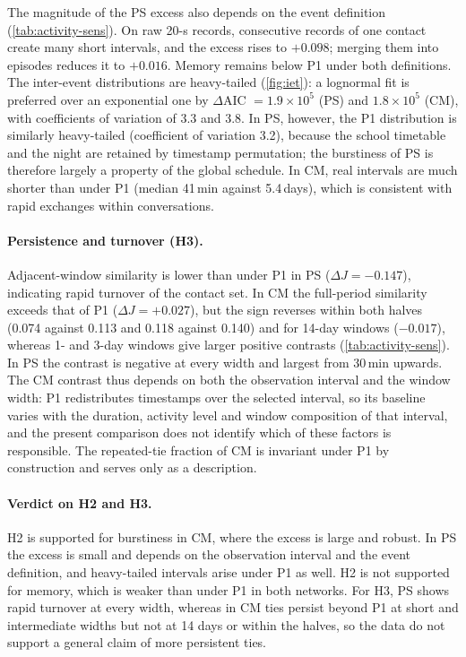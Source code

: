 The magnitude of the PS excess also depends on the event definition
(\cref{tab:activity-sens}). On raw 20-s records, consecutive records of one contact create
many short intervals, and the excess rises to $+0.098$; merging them into episodes reduces it
to $+0.016$. Memory remains below P1 under both definitions. The inter-event distributions
are heavy-tailed (\cref{fig:iet}): a lognormal fit is preferred over an exponential one by
$\Delta$AIC $=1.9\times10^5$ (PS) and $1.8\times10^5$ (CM), with coefficients of variation
of 3.3 and 3.8. In PS, however, the P1 distribution is similarly heavy-tailed (coefficient
of variation 3.2), because the school timetable and the night are retained by timestamp
permutation; the burstiness of PS is therefore largely a property of the global schedule.
In CM, real intervals are much shorter than under P1 (median 41\,min against 5.4\,days),
which is consistent with rapid exchanges within conversations.

\paragraph{Persistence and turnover (H3).}
Adjacent-window similarity is lower than under P1 in PS ($\Delta J=-0.147$), indicating
rapid turnover of the contact set. In CM the full-period similarity exceeds that of P1
($\Delta J=+0.027$), but the sign reverses within both halves (0.074 against 0.113 and 0.118
against 0.140) and for 14-day windows ($-0.017$), whereas 1- and 3-day windows give larger
positive contrasts (\cref{tab:activity-sens}). In PS the contrast is negative at every width
and largest from 30\,min upwards. The CM contrast thus depends on both the observation
interval and the window width: P1 redistributes
timestamps over the selected interval, so its baseline varies with the duration, activity
level and window composition of that interval, and the present comparison does not identify
which of these factors is responsible. The repeated-tie fraction of CM is invariant under
P1 by construction and serves only as a description.

\paragraph{Verdict on H2 and H3.}
H2 is supported for burstiness in CM, where the excess is large and robust. In PS the
excess is small and depends on the observation interval and the event definition, and
heavy-tailed intervals arise under P1 as well. H2 is not supported for memory, which is
weaker than under P1 in both networks. For H3, PS shows rapid turnover at every width,
whereas in CM ties persist beyond P1 at short and intermediate widths but not at 14 days or
within the halves, so the data do not support a general claim of more persistent ties.
